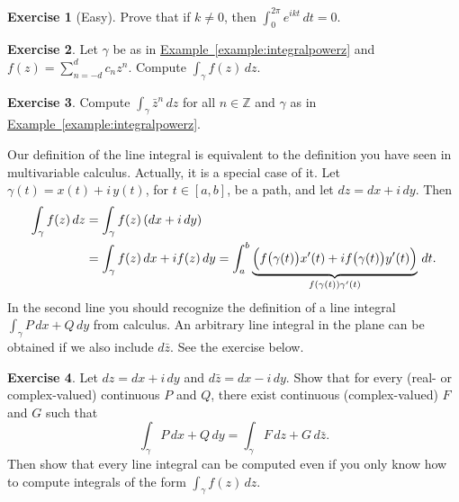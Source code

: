 \documentclass[12pt,openany]{book}
\newcommand{\Z}{{\mathbb{Z}}}
\theoremstyle{plain}
\theoremstyle{remark}
\theoremstyle{definition}
\newenvironment{exbox}{%
    \def\FrameCommand{\vrule width 1pt \relax\hspace{10pt}}%
    \MakeFramed{\advance\hsize-\width\FrameRestore}%
}{%
    \endMakeFramed
}
\theoremstyle{exercise}
\newtheorem{exercise}{Exercise}[section]
\theoremstyle{example}
\newcommand{\exampleref}[1]{\hyperref[#1]{Example~\ref*{#1}}}
\begin{document}
\begin{exbox}
\begin{exercise}[Easy]
Prove that if $k\not= 0$, then $\int_0^{2\pi} e^{ik t} \, dt = 0$.
\end{exercise}

\begin{exercise}
Let $\gamma$ be as in \exampleref{example:integralpowerz}
and 
$f(z) = \sum_{n=-d}^d c_n z^n$.
Compute $\int_\gamma f(z) \, dz$.
\end{exercise}

\begin{exercise}
Compute $\int_\gamma \bar{z}^n \, dz$ for all $n \in \Z$ and $\gamma$ as in
\exampleref{example:integralpowerz}.
\end{exercise}
\end{exbox}

Our definition of the line integral is equivalent to the definition you
have seen in multivariable calculus.  Actually, it is a special case of it.
Let $\gamma(t) = x(t) +i \, y(t)$, for $t \in [a,b]$, be a path,
and let $dz = dx + i\, dy$.
Then
\begin{equation*}
\begin{split}
\int_{\gamma} f(z) \, dz
& =
\int_{\gamma} f(z) \, (dx + i\, dy)
\\
& =
\int_{\gamma} f(z) \, dx + i f(z) \, dy
=
\int_a^b \underbrace{\Bigl( f\bigl(\gamma(t)\bigr) x'(t) + i f\bigl(\gamma(t)\bigr) y'(t) \Bigr)}_{f(\gamma(t)) \gamma'(t)} \, dt .
\end{split}
\end{equation*}
In the second line you should recognize the definition of a line integral
$\int_\gamma P\,dx + Q \, dy$ from calculus.  An arbitrary
line integral in the plane can be obtained if we also include $d\bar{z}$.  See the
exercise below.

\begin{exbox}
\begin{exercise} \label{exercise:realpathintegral}
%
Let $dz = dx + i \, dy$ and 
$d\bar{z} = dx - i \, dy$.  Show that for every (real- or complex-valued) continuous $P$ and $Q$,
there exist continuous (complex-valued) $F$ and $G$ such that
\begin{equation*}
\int_{\gamma} P \, dx + Q \, dy
=
\int_{\gamma} F \, dz + G \, d\bar{z} .
\end{equation*}
Then show that every line integral
can be computed even if you only know how to compute integrals of the form
$\int_\gamma f(z) \, dz$.
\end{exercise}
\end{exbox}
\end{document}
